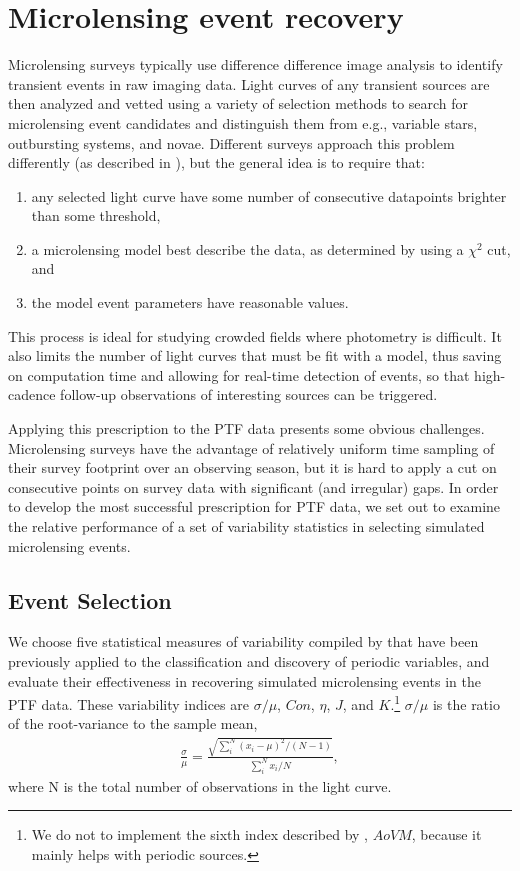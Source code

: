 \documentclass[12pt,preprint]{aastex}
\begin{document}
\section{Microlensing event recovery} \label{sec:event_recovery}
Microlensing surveys typically use difference difference image analysis \citep{alard1998} to identify transient events in raw imaging data. Light curves of any transient sources are then analyzed and vetted using a variety of selection methods to search for microlensing event candidates and distinguish them from e.g., variable stars, outbursting systems, and novae. Different surveys approach this problem differently (as described in \citealt{ogle_optical_depth, con_idx, alcock2000, macho_detection_efficiency, hamadache2009, wyrzykowski2009, sumi2011}), but the general idea is to require that: 

\begin{enumerate}
	\item any selected light curve have some number of consecutive datapoints brighter than some threshold,
	\item a microlensing model best describe the data, as determined by using a $\chi^2$ cut, and
	\item the model event parameters have reasonable values.
\end{enumerate}

This process is ideal for studying crowded fields where photometry is difficult. It also limits the number of light curves that must be fit with a model, thus saving on computation time and allowing for real-time detection of events, so that high-cadence follow-up observations of interesting sources can be triggered. 

Applying this prescription to the PTF data presents some obvious challenges. Microlensing surveys have the advantage of relatively uniform time sampling of their survey footprint over an observing season, but it is hard to apply a cut on consecutive points on survey data with significant (and irregular) gaps. In order to develop the most successful prescription for PTF data, we set out to examine the relative performance of a set of variability statistics in selecting simulated microlensing events.

\subsection{Event Selection} \label{sec:event_selection}
We choose five statistical measures of variability compiled by \cite{shin2009} that have been previously applied to the classification and discovery of periodic variables, and evaluate their effectiveness in recovering simulated microlensing events in the PTF data. These variability indices are $\sigma/\mu$, $Con$, $\eta$, $J$, and $K$.\footnote{We do not to implement the sixth index described by \cite{shin2009}, $AoVM$, because it mainly helps with periodic sources.} $\sigma/\mu$ is the ratio of the root-variance to the sample mean, 
\begin{align}
	\frac{\sigma}{\mu} = \frac{\sqrt{\sum^N_i (x_i - \mu)^2 / (N-1)}}{\sum^N_i x_i/N},
\end{align}
where N is the total number of observations in the light curve. 
\end{document}
